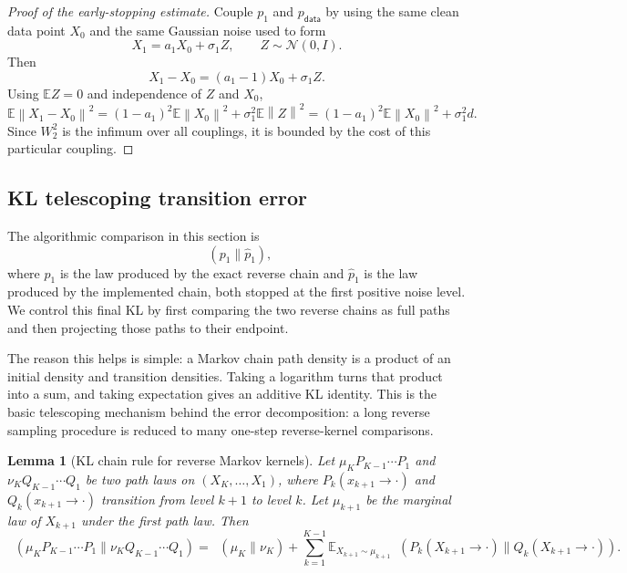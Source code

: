 \documentclass[10pt,a4paper]{amsart}
\numberwithin{equation}{section}
\newtheorem{lemma}[theorem]{Lemma}
\DeclareMathOperator{\KL}{D_{\mathsf{KL}}}
\newcommand{\E}{\mathbb{E}}
\newcommand{\Id}{I}
\newcommand{\wh}[1]{\widehat{#1}}
\newcommand{\norm}[1]{\left\lVert #1 \right\rVert}
\newcommand{\pdata}{p_{\mathsf{data}}}
\newcommand{\normal}[2]{\mathcal{N}\!\left(#1,#2\right)}
\begin{document}
\begin{proof}[Proof of the early-stopping estimate]
Couple $p_1$ and $\pdata$ by using the same clean data point $X_0$ and the
same Gaussian noise used to form
\[
    X_1=a_1X_0+\sigma_1Z,\qquad Z\sim\normal{0}{\Id}.
\]
Then
\[
    X_1-X_0=(a_1-1)X_0+\sigma_1Z.
\]
Using $\E Z=0$ and independence of $Z$ and $X_0$,
\[
    \E\norm{X_1-X_0}^2
    =
    (1-a_1)^2\E\norm{X_0}^2+\sigma_1^2\E\norm{Z}^2
    =
    (1-a_1)^2\E\norm{X_0}^2+\sigma_1^2d.
\]
Since $W_2^2$ is the infimum over all couplings, it is bounded by the cost
of this particular coupling.
\end{proof}

\subsection{KL telescoping transition error}

The algorithmic comparison in this section is
\[
    \KL(p_1\|\wh p_1),
\]
where $p_1$ is the law produced by the exact reverse chain and $\wh p_1$ is the
law produced by the implemented chain, both stopped at the first positive noise
level.  We control this final KL by first comparing the two reverse chains as
full paths and then projecting those paths to their endpoint.

The reason this helps is simple: a Markov chain path density is a product of an
initial density and transition densities.  Taking a logarithm turns that product
into a sum, and taking expectation gives an additive KL identity.  This is the
basic telescoping mechanism behind the error decomposition: a long reverse
sampling procedure is reduced to many one-step reverse-kernel comparisons.

\begin{lemma}[KL chain rule for reverse Markov kernels]\label{lem:kl-chain}
Let $\mu_KP_{K-1}\cdots P_1$ and $\nu_KQ_{K-1}\cdots Q_1$ be two path laws on
$(X_K,\ldots,X_1)$, where $P_k(x_{k+1} \to \cdot)$ and
$Q_k(x_{k+1} \to \cdot)$ transition from level $k+1$ to level $k$.  Let
$\mu_{k+1}$ be the marginal law of $X_{k+1}$ under the first path law.  Then
\[
    \KL(\mu_KP_{K-1}\cdots P_1\|\nu_KQ_{K-1}\cdots Q_1)
    =
    \KL(\mu_K\|\nu_K)
    +
    \sum_{k=1}^{K-1}
    \E_{X_{k+1}\sim\mu_{k+1}}
    \KL(P_k(X_{k+1} \to \cdot)\|Q_k(X_{k+1} \to \cdot)).
\]
\end{lemma}
\end{document}
